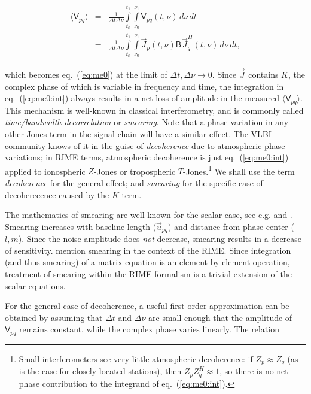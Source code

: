 \documentclass[]{aa}
\newcommand{\herm}{H}
\newcommand{\jones}[2]{\vec {#1}_{#2}}
\newcommand{\jonesT}[2]{\vec {#1}^{\herm}_{#2}}
\newcommand{\coh}[2]{\mathsf{{#1}}_{{#2}}}
\begin{document}
\begin{eqnarray}
\langle \coh{V}{pq} \rangle & = & \frac{1}{\Delta t\Delta\nu}\int\limits^{t_1}_{t_0} \int\limits^{\nu_1}_{\nu_0} \coh{V}{pq}(t,\nu)\,d\nu\,dt \nonumber \\
\label{eq:me0:int}
& = & \frac{1}{\Delta t\Delta\nu}\int\limits^{t_1}_{t_0} \int\limits^{\nu_1}_{\nu_0} \jones{J}{p} (t,\nu) \coh{B}{}  \jonesT{J}{q}(t,\nu) \, d\nu\,dt,
\end{eqnarray}

which becomes eq.~(\ref{eq:me0}) at the limit of $\Delta t,\Delta\nu \to 0$. Since $\jones{J}{}$ contains $K$, the complex phase of which is variable in frequency and time, the integration in eq.~(\ref{eq:me0:int}) always results in a net loss of amplitude in the measured $\langle \coh{V}{pq} \rangle $. This mechanism is well-known in classical interferometry, and is commonly called {\em time/bandwidth decorrelation} or {\em smearing}. Note that a phase variation in any other Jones term in the signal chain will have a similar effect. The VLBI community knows of it in the guise of {\em decoherence} due to atmospheric phase variations; in RIME terms, atmospheric decoherence is just eq.~(\ref{eq:me0:int}) applied to ionospheric $Z$-Jones or tropospheric $T$-Jones.\footnote{Small interferometers see very little atmospheric decoherence: if $Z_p\approx Z_q$ (as is the case for closely located stations), then $Z_p Z^\herm_q \approx 1$, so there is no net phase contribution to the integrand of eq.~(\ref{eq:me0:int}).} We shall use the term {\em decoherence} for the general effect; and {\em smearing} for the specific case of decoherecence caused by the $K$ term.

The mathematics of smearing are well-known for the scalar case, see e.g. \citet[Sect.~6.4]{tms} and \citet{Bridle:smearing}. Smearing increases with baseline length ($\vec u_{pq}$) and distance from phase center ($l,m$). Since the noise amplitude does {\em not} decrease, smearing results in a decrease of sensitivity. \citet{ME1} mention smearing in the context of the RIME. Since integration (and thus smearing) of a matrix equation is an element-by-element operation,  treatment of smearing within the RIME formalism is a trivial extension of the scalar equations.

For the general case of decoherence, a useful first-order approximation can be obtained by assuming that $\Delta t$ and $\Delta\nu$ are small enough that the amplitude of $\coh{V}{pq}$ remains constant, while the complex phase varies linearly. The relation
\end{document}
